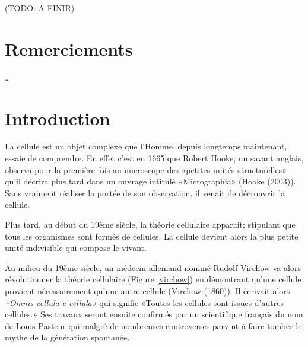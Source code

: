 \documentclass[12pt,a4paper,twoside,openright]{book}
\begin{document}
(TODO: A FINIR)

\chapter{Remerciements}\label{remerciements}

\ldots{}

\tableofcontents

\setcounter{page}{1} 

\mainmatter

\chapter{Introduction}\label{introduction}

La cellule est un objet complexe que l'Homme, depuis longtemps
maintenant, essaie de comprendre. En effet c'est en 1665 que Robert
Hooke, un savant anglais, observa pour la première fois au microscope
des «petites unités structurelles» qu'il décrira plus tard dans un
ouvrage intitulé «Micrographia» (Hooke (2003)). Sans vraiment réaliser
la portée de son observation, il venait de décrouvrir la cellule.

Plus tard, au début du 19ème siècle, la théorie cellulaire apparait;
stipulant que tous les organismes sont formés de cellules. La cellule
devient alors la plus petite unité indivisible qui compose le vivant.

Au milieu du 19ème siècle, un médecin allemand nommé Rudolf Virchow va
alors révolutionner la théorie cellulaire (Figure \ref{virchow}) en
démontrant qu'une cellule provient nécessairement qu'une autre cellule
(Virchow (1860)). Il écrivait alors \emph{«Omnis cellula e cellula»} qui
signifie «Toutes les cellules sont issues d'autres cellules.» Ses
travaux seront ensuite confirmés par un scientifique français du nom de
Louis Pasteur qui malgré de nombreuses controverses parvint à faire
tomber le mythe de la génération spontanée.
\end{document}
